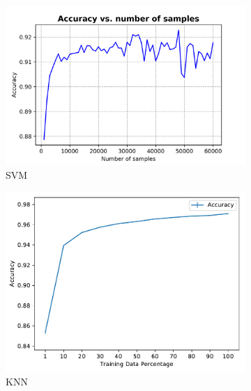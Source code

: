 \documentclass[10pt]{scrartcl}
\begin{document}
\begin{figure}[H]
	\centering
	\begin{subfigure}{0.4\linewidth}
		\centering
		\includegraphics[width=1\linewidth]{figures/accuracy_vs_samples_linearsvm_default.png}
		\caption{SVM}\label{fig:1a}		
	\end{subfigure}
	\begin{subfigure}{0.35\linewidth}
		\centering
		\includegraphics[width=1\linewidth]{figures/KNN_accuracy_vs_tss_with_fixed_k.pdf}
		\caption{KNN}\label{fig:1b}
	\end{subfigure}
	\begin{subfigure}{0.4\linewidth}
		\centering

\end{subfigure}
\end{figure}
\end{document}
